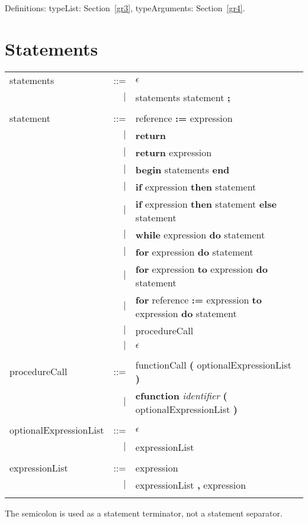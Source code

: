 Definitions:
typeList: Section~\ref{gr3},
typeArguments: Section~\ref{gr4}.

\section{Statements}\label{gr6}

\begin{tabular}{l r l}
statements & ::= & $\epsilon$ \\
& $\mid$ & statements statement {\bf ;} \\ \\
statement & ::= & reference {\bf :=} expression \\
& $\mid$ & {\bf return} \\
& $\mid$ & {\bf return} expression \\
& $\mid$ & {\bf begin} statements {\bf end} \\
& $\mid$ & {\bf if} expression {\bf then} statement \\
& $\mid$ & {\bf if} expression {\bf then} statement {\bf else} statement \\
& $\mid$ & {\bf while} expression {\bf do} statement \\
& $\mid$ & {\bf for} expression {\bf do} statement \\
& $\mid$ & {\bf for} expression {\bf to} expression {\bf do} statement \\
& $\mid$ & {\bf for} reference {\bf :=} expression {\bf to} expression {\bf do} statement \\
& $\mid$ & procedureCall \\
& $\mid$ & $\epsilon$ \\ \\
procedureCall & ::= & functionCall {\bf (} optionalExpressionList {\bf )} \\
& $\mid$ & {\bf cfunction} {\em identifier} {\bf (} optionalExpressionList {\bf )} \\ \\
optionalExpressionList & ::= & $\epsilon$ \\
& $\mid$ & expressionList \\ \\
expressionList & ::= & expression \\
& $\mid$ & expressionList {\bf ,} expression \\ \\
\end{tabular}

The semicolon is used as a statement terminator, not a statement separator.

